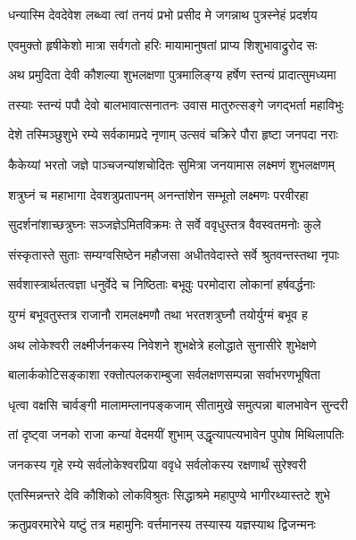 
\twolineshloka
{धन्यास्मि देवदेवेश लब्ध्वा त्वां तनयं प्रभो}
{प्रसीद मे जगन्नाथ पुत्रस्नेहं प्रदर्शय}%


\twolineshloka
{एवमुक्तो हृषीकेशो मात्रा सर्वगतो हरिः}
{मायामानुषतां प्राप्य शिशुभावाद्रुरोद सः}%

\twolineshloka
{अथ प्रमुदिता देवी कौशल्या शुभलक्षणा}
{पुत्रमालिङ्ग्य हर्षेण स्तन्यं प्रादात्सुमध्यमा}%

\twolineshloka
{तस्याः स्तन्यं पपौ देवो बालभावात्सनातनः}
{उवास मातुरुत्सङ्गे जगद्भर्ता महाविभुः}%

\twolineshloka
{देशे तस्मिञ्छुशुभे रम्ये सर्वकामप्रदे नृणाम्}
{उत्सवं चक्रिरे पौरा हृष्टा जनपदा नराः}%

\twolineshloka
{कैकेय्यां भरतो जज्ञे पाञ्चजन्यांशचोदितः}
{सुमित्रा जनयामास लक्ष्मणं शुभलक्षणम्}%

\twolineshloka
{शत्रुघ्नं च महाभागा देवशत्रुप्रतापनम्}
{अनन्तांशेन सम्भूतो लक्ष्मणः परवीरहा}%

\twolineshloka
{सुदर्शनांशाच्छत्रुघ्नः सञ्जज्ञेऽमितविक्रमः}
{ते सर्वे ववृधुस्तत्र वैवस्वतमनोः कुले}%

\twolineshloka
{संस्कृतास्ते सुताः सम्यग्वसिष्ठेन महौजसा}
{अधीतवेदास्ते सर्वे श्रुतवन्तस्तथा नृपाः}%

\twolineshloka
{सर्वशास्त्रार्थतत्वज्ञा धनुर्वेदे च निष्ठिताः}
{बभूवुः परमोदारा लोकानां हर्षवर्द्धनाः}%

\twolineshloka
{युग्मं बभूवतुस्तत्र राजानौ रामलक्ष्मणौ}
{तथा भरतशत्रुघ्नौ तयोर्युग्मं बभूव ह}%

\twolineshloka
{अथ लोकेश्वरी लक्ष्मीर्जनकस्य निवेशने}
{शुभक्षेत्रे हलोद्धाते सुनासीरे शुभेक्षणे}%

\twolineshloka
{बालार्ककोटिसङ्काशा रक्तोत्पलकराम्बुजा}
{सर्वलक्षणसम्पन्ना सर्वाभरणभूषिता}%

\twolineshloka
{धृत्वा वक्षसि चार्वङ्गी मालामम्लानपङ्कजाम्}
{सीतामुखे समुत्पन्ना बालभावेन सुन्दरी}%

\twolineshloka
{तां दृष्ट्वा जनको राजा कन्यां वेदमयीं शुभाम्}
{उद्धृत्यापत्यभावेन पुपोष मिथिलापतिः}%

\twolineshloka
{जनकस्य गृहे रम्ये सर्वलोकेश्वरप्रिया}
{ववृधे सर्वलोकस्य रक्षणार्थं सुरेश्वरी}%

\twolineshloka
{एतस्मिन्नन्तरे देवि कौशिको लोकविश्रुतः}
{सिद्धाश्रमे महापुण्ये भागीरथ्यास्तटे शुभे}%

\twolineshloka
{क्रतुप्रवरमारेभे यष्टुं तत्र महामुनिः}
{वर्त्तमानस्य तस्यास्य यज्ञस्याथ द्विजन्मनः}%

